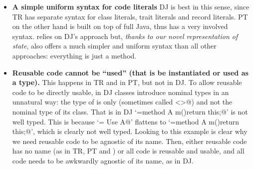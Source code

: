 \begin{itemize}
\item {\bf A simple uniform syntax for code literals}
DJ is best in this sense, since TR has separate syntax for class literals, trait literals and record literals.
PT on the other hand is built on top of full Java, thus has a very
involved syntax.
\name relies on DJ's approach but,
\emph{thanks to our novel representation of state}, \name also offers a much simpler and uniform syntax than
all other approaches: everything is just a method.
\item 
{\bf Reusable code cannot be ``used'' (that is be instantiated or used as a type).}
This happens in TR and in PT, but not in DJ. To allow reusable code to be directly 
usable, in DJ
classes introduce nominal types in an unnatural way: the type of
\Q@this@ is only \Q@This@ (sometimes called \Q@<>@) and not the
nominal type of its class. 
That is in DJ 
`\Q@A={method A m(){return this;}}@' is not well typed. This is because
`\Q@B= Use A@' flattens to `\Q@B={method A m(){return this;}}@', which is clearly not well typed.
Looking to this example is clear why we need reusable code to be agnostic of its name.
Then, either reusable code has no name (as in TR, PT and \name)
or all code is reusable and usable, and all code needs to be awkwardly agnostic of its name, as in DJ.


\end{itemize}

